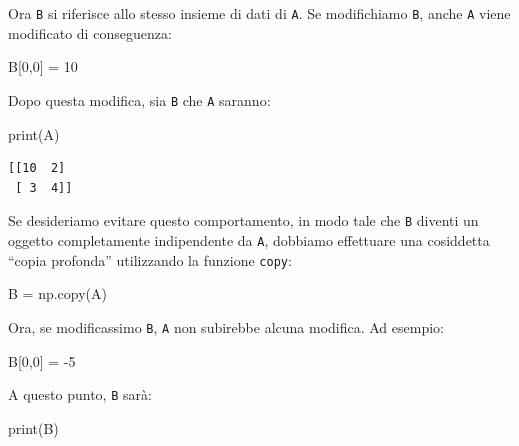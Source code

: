 \documentclass[
  letterpaper,
  krantz2]{{[}./krantz{]}}
\newenvironment{Shaded}{\begin{snugshade}}{\end{snugshade}}
\newcommand{\BuiltInTok}[1]{\textcolor[rgb]{0.00,0.23,0.31}{#1}}
\newcommand{\DecValTok}[1]{\textcolor[rgb]{0.68,0.00,0.00}{#1}}
\newcommand{\NormalTok}[1]{\textcolor[rgb]{0.00,0.23,0.31}{#1}}
\newcommand{\OperatorTok}[1]{\textcolor[rgb]{0.37,0.37,0.37}{#1}}
\begin{document}
Ora \texttt{B} si riferisce allo stesso insieme di dati di \texttt{A}.
Se modifichiamo \texttt{B}, anche \texttt{A} viene modificato di
conseguenza:

\begin{Shaded}
\begin{Highlighting}[]
\NormalTok{B[}\DecValTok{0}\NormalTok{,}\DecValTok{0}\NormalTok{] }\OperatorTok{=} \DecValTok{10}
\end{Highlighting}
\end{Shaded}

Dopo questa modifica, sia \texttt{B} che \texttt{A} saranno:

\begin{Shaded}
\begin{Highlighting}[]
\BuiltInTok{print}\NormalTok{(A)}
\end{Highlighting}
\end{Shaded}

\begin{verbatim}
[[10  2]
 [ 3  4]]
\end{verbatim}

Se desideriamo evitare questo comportamento, in modo tale che \texttt{B}
diventi un oggetto completamente indipendente da \texttt{A}, dobbiamo
effettuare una cosiddetta ``copia profonda'' utilizzando la funzione
\texttt{copy}:

\begin{Shaded}
\begin{Highlighting}[]
\NormalTok{B }\OperatorTok{=}\NormalTok{ np.copy(A)}
\end{Highlighting}
\end{Shaded}

Ora, se modificassimo \texttt{B}, \texttt{A} non subirebbe alcuna
modifica. Ad esempio:

\begin{Shaded}
\begin{Highlighting}[]
\NormalTok{B[}\DecValTok{0}\NormalTok{,}\DecValTok{0}\NormalTok{] }\OperatorTok{=} \OperatorTok{{-}}\DecValTok{5}
\end{Highlighting}
\end{Shaded}

A questo punto, \texttt{B} sarà:

\begin{Shaded}
\begin{Highlighting}[]
\BuiltInTok{print}\NormalTok{(B)}
\end{Highlighting}
\end{Shaded}
\end{document}
